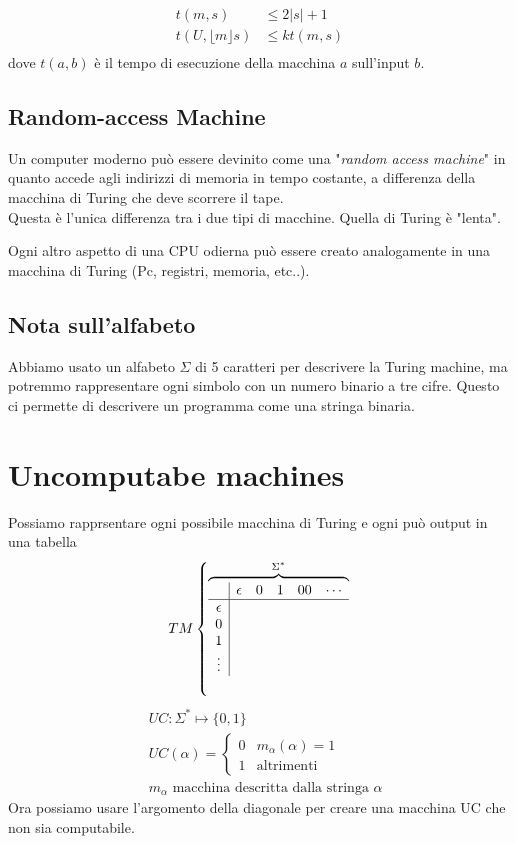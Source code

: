 \documentclass{article}
\begin{document}
\begin{align*}
    t(m,s) &\leq 2|s|+1 \\
    t(U,\lfloor m \rfloor s) &\leq k t(m,s) \\
\end{align*}
dove $t(a,b)$ è il tempo di esecuzione della macchina $a$ sull'input $b$.

\subsection{Random-access Machine}
Un computer moderno può essere devinito come una "\textit{random access machine}" in quanto accede agli indirizzi di memoria in tempo costante, a differenza della macchina di Turing che deve scorrere il tape.\\
Questa è l'unica differenza tra i due tipi di macchine. Quella di Turing è "lenta".

Ogni altro aspetto di una CPU odierna può essere creato analogamente in una macchina di Turing (Pc, registri, memoria, etc..).

\subsection*{Nota sull'alfabeto}
Abbiamo usato un alfabeto $\Sigma$ di 5 caratteri per descrivere la Turing machine, ma potremmo rappresentare ogni simbolo con un numero binario a tre cifre. Questo ci permette di descrivere un programma come una stringa binaria.

\section{Uncomputabe machines}
Possiamo rapprsentare ogni possibile macchina di Turing e ogni può output in una tabella
\[
    TM\left\{\overbrace{\begin{array}{c|c c c c c}
            & \epsilon & 0 & 1 & 00 & \cdots \\
            \hline
        \epsilon & \\
        0   &  \\
        1 & \\
        \vdots & 

    \end{array}}^{\Sigma^*}\right.
\]
\begin{align*}
    & UC: \Sigma^*\mapsto\{0,1\} \\
    & UC(\alpha) = \begin{cases}
        0 & m_\alpha(\alpha)=1 \\
        1 & \text{altrimenti}
    \end{cases} \\
    & m_\alpha \text{ macchina descritta dalla stringa } \alpha
\end{align*}
Ora possiamo usare l'argomento della diagonale per creare una macchina UC che non sia computabile.
\end{document}
